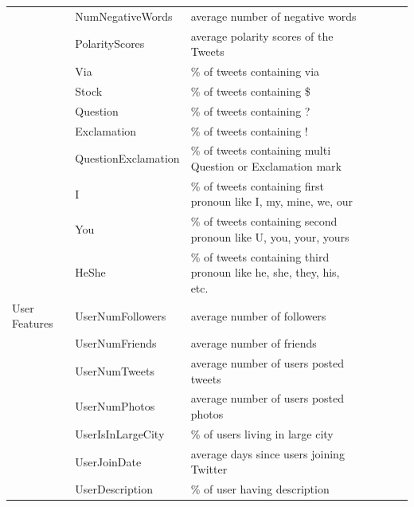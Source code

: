\begin{table}[!h]
{\begin{tabular}{@{}lllllll@{}}
   & NumNegativeWords & average number of negative words \cite{castillo2011information}\cite{gupta2014tweetcred}\cite{yang2012automatic}\cite{liu2015real}\\
   & PolarityScores & average polarity scores of the Tweets \cite{castillo2011information}\cite{yang2012automatic}\cite{liu2015real}\\
   & Via & \% of tweets containing via \cite{gupta2014tweetcred}\\
   & Stock & \% of tweets containing \$  \cite{castillo2011information}\cite{gupta2014tweetcred}\\
   & Question & \% of tweets containing ? \cite{castillo2011information}\cite{liu2015real}\\
   & Exclamation & \% of tweets containing ! \cite{castillo2011information}\cite{liu2015real}\\
   & QuestionExclamation & \% of tweets containing multi Question or Exclamation mark \cite{castillo2011information}\cite{liu2015real}\\ 
   & I & \% of tweets containing first pronoun like I, my, mine, we, our    \cite{castillo2011information}\cite{gupta2014tweetcred}\cite{liu2015real}\\
   & You & \% of tweets containing second pronoun like U, you, your, yours  \cite{castillo2011information}\\ 
   & HeShe & \% of tweets containing third pronoun like he, she, they, his, etc.  \cite{castillo2011information}\\ \midrule
   User Features & UserNumFollowers  & average number of followers \cite{castillo2011information}\cite{gupta2014tweetcred}\cite{liu2015real}\\
 	& UserNumFriends  & average number of friends \cite{castillo2011information}\cite{gupta2014tweetcred}\cite{liu2015real}\\
 	& UserNumTweets  & average number of users posted tweets \cite{castillo2011information}\cite{gupta2014tweetcred}\cite{yang2012automatic}\cite{liu2015real}
\\
 	& UserNumPhotos  & average number of users posted photos \cite{yang2012automatic}\\
 	& UserIsInLargeCity  & \% of users living in large city \cite{yang2012automatic}\cite{liu2015real}\\
 	& UserJoinDate & average days since users joining Twitter \cite{castillo2011information}\cite{yang2012automatic}\cite{liu2015real}
\\
 	& UserDescription  & \% of user having description \cite{castillo2011information}\cite{yang2012automatic}\cite{liu2015real}

\end{tabular}}
\end{table}
